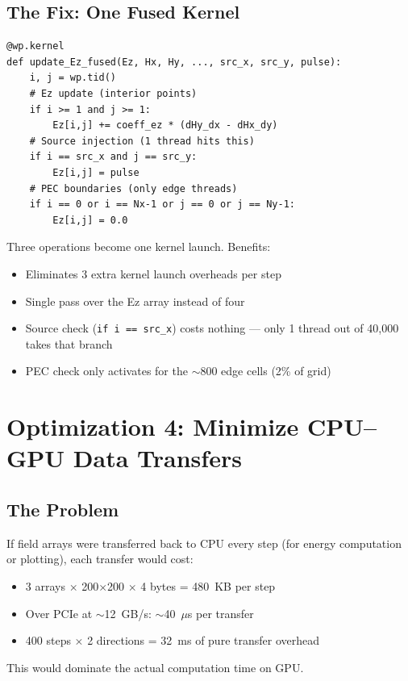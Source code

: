 \documentclass[11pt,a4paper]{article}
\begin{document}
\subsection{The Fix: One Fused Kernel}

\begin{lstlisting}[caption={Fused Ez + source + PEC kernel}]
@wp.kernel
def update_Ez_fused(Ez, Hx, Hy, ..., src_x, src_y, pulse):
    i, j = wp.tid()
    # Ez update (interior points)
    if i >= 1 and j >= 1:
        Ez[i,j] += coeff_ez * (dHy_dx - dHx_dy)
    # Source injection (1 thread hits this)
    if i == src_x and j == src_y:
        Ez[i,j] = pulse
    # PEC boundaries (only edge threads)
    if i == 0 or i == Nx-1 or j == 0 or j == Ny-1:
        Ez[i,j] = 0.0
\end{lstlisting}

\begin{tcolorbox}[colback=green!3, colframe=okgreen, title=\textbf{Fix \#3: Kernel fusion}]
Three operations become one kernel launch. Benefits:
\begin{itemize}[nosep]
    \item Eliminates 3 extra kernel launch overheads per step
    \item Single pass over the Ez array instead of four
    \item Source check (\texttt{if i == src\_x}) costs nothing --- only 1 thread out of 40,000 takes that branch
    \item PEC check only activates for the $\sim$800 edge cells (2\% of grid)
\end{itemize}
\end{tcolorbox}


\section{Optimization 4: Minimize CPU--GPU Data Transfers}

\subsection{The Problem}

\begin{tcolorbox}[colback=red!3, colframe=warnred, title=\textbf{Bottleneck \#4: PCIe transfer overhead}]
If field arrays were transferred back to CPU every step (for energy computation or plotting), each transfer would cost:
\begin{itemize}[nosep]
    \item 3 arrays $\times$ 200$\times$200 $\times$ 4 bytes = 480~KB per step
    \item Over PCIe at $\sim$12~GB/s: $\sim$40~$\mu$s per transfer
    \item 400 steps $\times$ 2 directions = 32~ms of pure transfer overhead
\end{itemize}
This would dominate the actual computation time on GPU.
\end{tcolorbox}
\end{document}
